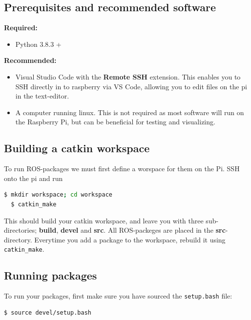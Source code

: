 \subsection{Prerequisites and recommended software}

\textbf{Required:}
\begin{itemize}
    \item Python 3.8.3 +
\end{itemize}
\textbf{Recommended:}
\begin{itemize}
    \item Visual Studio Code with the \textbf{Remote SSH} extension. This enables you to SSH directly in to raspberry via VS Code, allowing you to edit files on the pi in the text-editor.
    \item A computer running linux. This is not required as most software will run on the Raspberry Pi, but can be beneficial for testing and visualizing.
\end{itemize}

\subsection{Building a catkin workspace}

To run ROS-packages we must first define a worspace for them on the Pi. SSH onto the pi and run 

\begin{lstlisting}[language=bash,basicstyle=\mlttfamily, breaklines=true]
  $ mkdir workspace; cd workspace
  $ catkin_make
\end{lstlisting}

This should build your catkin workspace, and leave you with three sub-directories; \textbf{build}, \textbf{devel} and \textbf{src}. All ROS-packeges are placed in the \textbf{src}-directory. Everytime you add a package to the workspace, rebuild it using \lstinline{catkin_make}.

\subsection{Running packages}

To run your packages, first make sure you have sourced the \lstinline{setup.bash} file:

\begin{lstlisting}[language=bash,basicstyle=\mlttfamily, breaklines=true]
  $ source devel/setup.bash
\end{lstlisting}

